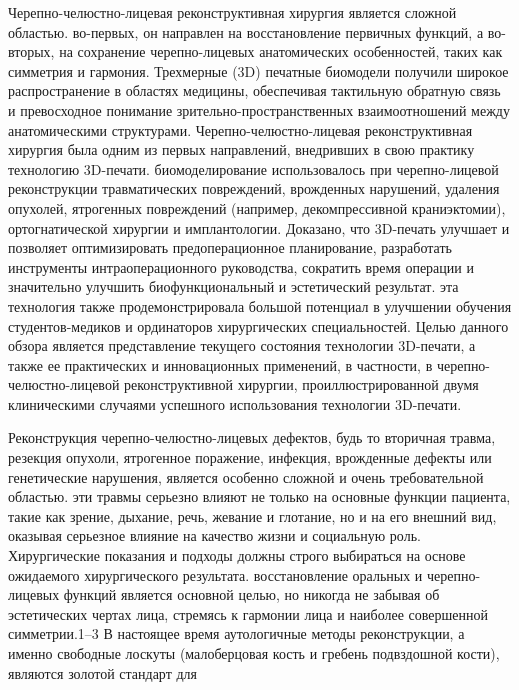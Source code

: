 
Черепно-челюстно-лицевая реконструктивная хирургия является сложной областью.
во-первых, он направлен на восстановление первичных функций, а во-вторых, на
сохранение черепно-лицевых анатомических особенностей, таких как симметрия и
гармония. Трехмерные (3D) печатные биомодели получили широкое распространение в
областях медицины, обеспечивая тактильную обратную связь и превосходное
понимание зрительно-пространственных взаимоотношений между анатомическими
структурами. Черепно-челюстно-лицевая реконструктивная хирургия была одним из
первых направлений, внедривших в свою практику технологию 3D-печати.
биомоделирование использовалось при черепно-лицевой реконструкции травматических
повреждений, врожденных нарушений, удаления опухолей, ятрогенных повреждений
(например, декомпрессивной краниэктомии), ортогнатической хирургии и
имплантологии. Доказано, что 3D-печать улучшает и позволяет оптимизировать
предоперационное планирование, разработать инструменты интраоперационного
руководства, сократить время операции и значительно улучшить биофункциональный и
эстетический результат. эта технология также продемонстрировала большой
потенциал в улучшении обучения студентов-медиков и ординаторов хирургических
специальностей. Целью данного обзора является представление текущего состояния
технологии 3D-печати, а также ее практических и инновационных применений, в
частности, в черепно-челюстно-лицевой реконструктивной хирургии,
проиллюстрированной двумя клиническими случаями успешного использования
технологии 3D-печати.

Реконструкция черепно-челюстно-лицевых дефектов, будь то вторичная травма,
резекция опухоли, ятрогенное поражение, инфекция, врожденные дефекты или
генетические нарушения, является особенно сложной и очень требовательной
областью. эти травмы серьезно влияют не только на основные функции пациента,
такие как зрение, дыхание, речь, жевание и глотание, но и на его внешний вид,
оказывая серьезное влияние на качество жизни и социальную роль. Хирургические
показания и подходы должны строго выбираться на основе ожидаемого хирургического
результата. восстановление оральных и черепно-лицевых функций является основной
целью, но никогда не забывая об эстетических чертах лица, стремясь к гармонии
лица и наиболее совершенной симметрии.1–3 В настоящее время аутологичные методы
реконструкции, а именно свободные лоскуты (малоберцовая кость и гребень
подвздошной кости), являются золотой стандарт для


